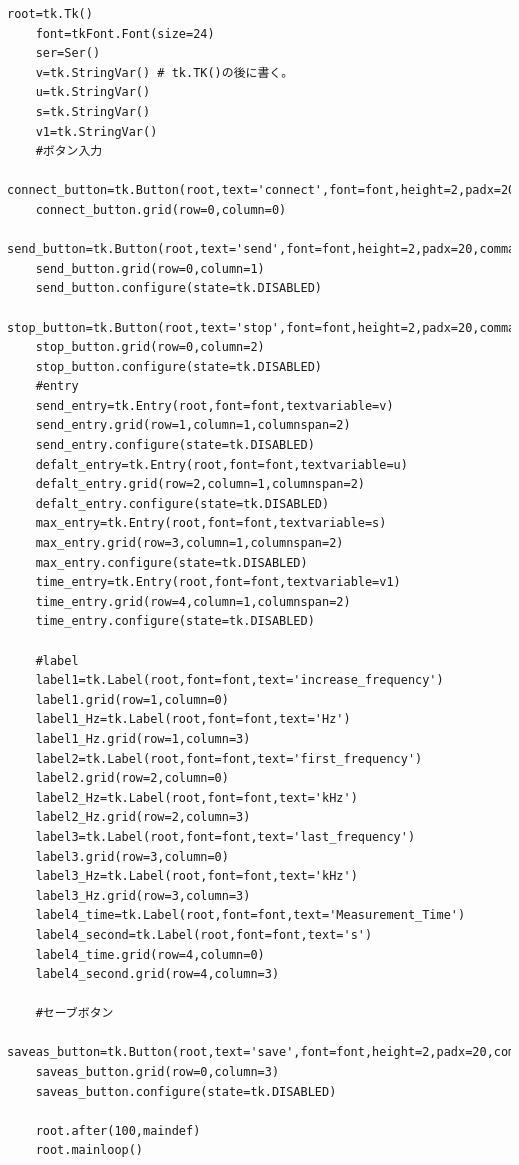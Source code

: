 \documentclass[12pt]{jarticle}
\begin{document}
\begin{lstlisting}[caption = GUIプログラム , label = program1]
	root=tk.Tk()
	font=tkFont.Font(size=24)
	ser=Ser() 
	v=tk.StringVar() # tk.TK()の後に書く。
	u=tk.StringVar()
	s=tk.StringVar()
	v1=tk.StringVar()
	#ボタン入力
	connect_button=tk.Button(root,text='connect',font=font,height=2,padx=20,command=ser.connect)
	connect_button.grid(row=0,column=0)
	send_button=tk.Button(root,text='send',font=font,height=2,padx=20,command=ser.send_com)
	send_button.grid(row=0,column=1)
	send_button.configure(state=tk.DISABLED)
	stop_button=tk.Button(root,text='stop',font=font,height=2,padx=20,command=ser.stop_com)
	stop_button.grid(row=0,column=2)
	stop_button.configure(state=tk.DISABLED)
	#entry
	send_entry=tk.Entry(root,font=font,textvariable=v)
	send_entry.grid(row=1,column=1,columnspan=2)
	send_entry.configure(state=tk.DISABLED)
	defalt_entry=tk.Entry(root,font=font,textvariable=u)
	defalt_entry.grid(row=2,column=1,columnspan=2)
	defalt_entry.configure(state=tk.DISABLED)
	max_entry=tk.Entry(root,font=font,textvariable=s)
	max_entry.grid(row=3,column=1,columnspan=2)
	max_entry.configure(state=tk.DISABLED)
	time_entry=tk.Entry(root,font=font,textvariable=v1)
	time_entry.grid(row=4,column=1,columnspan=2)
	time_entry.configure(state=tk.DISABLED)
	
	#label
	label1=tk.Label(root,font=font,text='increase_frequency')
	label1.grid(row=1,column=0)
	label1_Hz=tk.Label(root,font=font,text='Hz')
	label1_Hz.grid(row=1,column=3)
	label2=tk.Label(root,font=font,text='first_frequency')
	label2.grid(row=2,column=0)
	label2_Hz=tk.Label(root,font=font,text='kHz')
	label2_Hz.grid(row=2,column=3)
	label3=tk.Label(root,font=font,text='last_frequency')
	label3.grid(row=3,column=0)
	label3_Hz=tk.Label(root,font=font,text='kHz')
	label3_Hz.grid(row=3,column=3)
	label4_time=tk.Label(root,font=font,text='Measurement_Time')
	label4_second=tk.Label(root,font=font,text='s')
	label4_time.grid(row=4,column=0)
	label4_second.grid(row=4,column=3)
	
	#セーブボタン
	saveas_button=tk.Button(root,text='save',font=font,height=2,padx=20,command=saveas)
	saveas_button.grid(row=0,column=3)
	saveas_button.configure(state=tk.DISABLED)
	
	root.after(100,maindef)
	root.mainloop()   
	
	
	\end{lstlisting}
\end{document}
